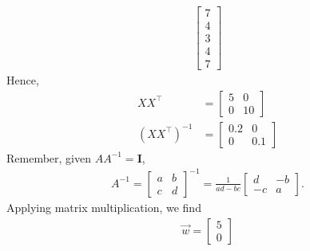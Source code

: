 \documentclass[11pt]{article}
\begin{document}
\begin{enumerate}[(1)]
\begin{enumerate}[(1)]
\begin{align*}
\begin{bmatrix}
			7 \\[0.3em]
			4 \\
			3 \\
			4 \\
			7
			\end{bmatrix}
			\end{align*}
			Hence,
			\begin{align*}
			XX^\top & = \begin{bmatrix}
			5 & 0          \\[0.3em]
			0 & 10
			\end{bmatrix} \\
			(XX^\top)^{-1} & = \begin{bmatrix}
			0.2 & 0          \\[0.3em]
			0 & 0.1
			\end{bmatrix}
			\end{align*}
			Remember, given $AA^{-1}=\textbf{I}$,
			\begin{align*}
			A^{-1} = \begin{bmatrix}
			a & b           \\[0.3em]
			c & d
			\end{bmatrix}^{-1} =
			\frac{1}{ad-bc}\begin{bmatrix}
			d & -b           \\[0.3em]
			-c & a
			\end{bmatrix}.
			\end{align*}
			Applying matrix multiplication, we find
			\begin{align*}
			\vec{w} = \begin{bmatrix}
			5           \\[0.3em]
			0
			\end{bmatrix}
			\end{align*}
			

\end{enumerate}
\end{enumerate}
\end{document}
